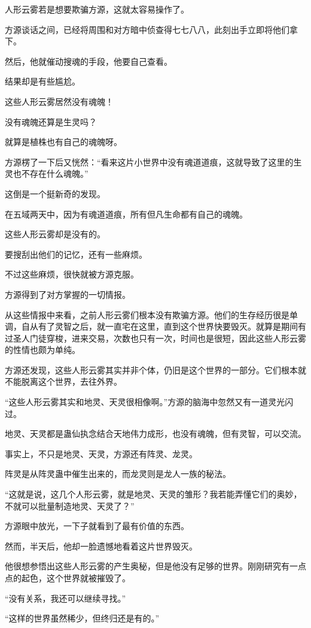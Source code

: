 \begin{this_body}
人形云雾若是想要欺骗方源，这就太容易操作了。

方源谈话之间，已经将周围和对方暗中侦查得七七八八，此刻出手立即将他们拿下。

然后，他就催动搜魂的手段，他要自己查看。

结果却是有些尴尬。

这些人形云雾居然没有魂魄！

没有魂魄还算是生灵吗？

就算是植株也有自己的魂魄呀。

方源楞了一下后又恍然：“看来这片小世界中没有魂道道痕，这就导致了这里的生灵也不存在什么魂魄。”

这倒是一个挺新奇的发现。

在五域两天中，因为有魂道道痕，所有但凡生命都有自己的魂魄。

这些人形云雾却是没有的。

要搜刮出他们的记忆，还有一些麻烦。

不过这些麻烦，很快就被方源克服。

方源得到了对方掌握的一切情报。

从这些情报中来看，之前人形云雾们根本没有欺骗方源。他们的生存经历很是单调，自从有了灵智之后，就一直宅在这里，直到这个世界快要毁灭。就算是期间有过圣人门徒穿梭，进来交易，次数也只有一次，时间也是很短，因此这些人形云雾的性情也颇为单纯。

方源还发现，这些人形云雾其实并非个体，仍旧是这个世界的一部分。它们根本就不能脱离这个世界，去往外界。

“这些人形云雾其实和地灵、天灵很相像啊。”方源的脑海中忽然又有一道灵光闪过。

地灵、天灵都是蛊仙执念结合天地伟力成形，也没有魂魄，但有灵智，可以交流。

事实上，不只是地灵、天灵，方源还有阵灵、龙灵。

阵灵是从阵灵蛊中催生出来的，而龙灵则是龙人一族的秘法。

“这就是说，这几个人形云雾，就是地灵、天灵的雏形？我若能弄懂它们的奥妙，不就可以批量制造地灵、天灵了？”

方源眼中放光，一下子就看到了最有价值的东西。

然而，半天后，他却一脸遗憾地看着这片世界毁灭。

他很想参悟出这些人形云雾的产生奥秘，但是他没有足够的世界。刚刚研究有一点点的起色，这个世界就被摧毁了。

“没有关系，我还可以继续寻找。”

“这样的世界虽然稀少，但终归还是有的。”


\end{this_body}
